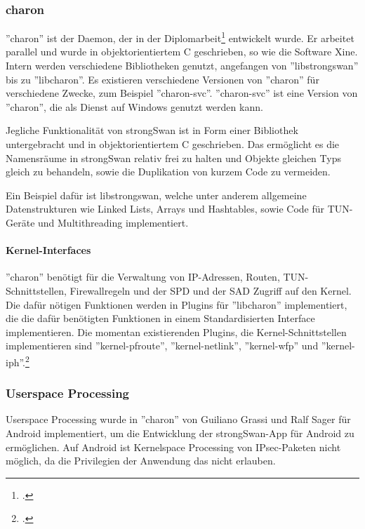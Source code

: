 \subsubsection{charon}
''charon'' ist der Daemon, der in der Diplomarbeit\footcite[][]{jan_hutter_strongswan_2005} entwickelt wurde.
Er arbeitet parallel und wurde in objektorientiertem C geschrieben, so wie die Software Xine.
Intern werden verschiedene Bibliotheken genutzt, angefangen von ''libstrongswan'' bis zu ''libcharon''.
Es existieren verschiedene Versionen von ''charon'' für verschiedene Zwecke, zum Beispiel
''charon-svc''. ''charon-svc'' ist eine Version von ''charon'', die als Dienst auf Windows genutzt werden kann.

Jegliche Funktionalität von strongSwan ist in Form einer Bibliothek untergebracht und in objektorientiertem
C geschrieben. Das ermöglicht es die Namensräume in strongSwan relativ frei zu halten
und Objekte gleichen Typs gleich zu behandeln, sowie die Duplikation von kurzem Code
zu vermeiden.

Ein Beispiel dafür ist libstrongswan, welche unter anderem 
allgemeine Datenstrukturen wie Linked Lists, Arrays und Hashtables, sowie Code für TUN-Geräte und
Multithreading implementiert.

\paragraph{Kernel-Interfaces}
''charon'' benötigt für die Verwaltung von \ac{IP}-Adressen, Routen, TUN-Schnittstellen,
Firewallregeln und
der \ac{SPD} und der \ac{SAD} Zugriff auf den Kernel. Die dafür nötigen Funktionen
werden in Plugins für ''libcharon'' implementiert, die die dafür benötigten Funktionen
in einem Standardisierten Interface implementieren. Die momentan existierenden Plugins,
die Kernel-Schnittstellen implementieren sind ''kernel-pfroute'', ''kernel-netlink'', ''kernel-wfp''
und ''kernel-iph''.\footcite[][]{_pluginlist_2016}

\subsubsection{Userspace Processing}
Userspace Processing wurde in ''charon'' von Guiliano Grassi und Ralf Sager für Android implementiert,
um die Entwicklung der strongSwan-App für Android zu ermöglichen. Auf Android ist Kernelspace Processing
von \ac{IPsec}-Paketen nicht möglich, da die Privilegien der Anwendung das nicht erlauben.

